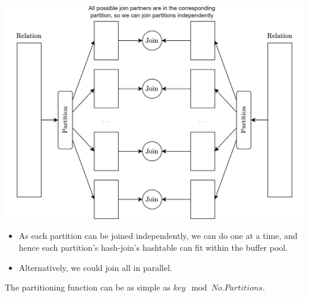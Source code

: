 \begin{center}
    \includegraphics[width=.9\textwidth]{algorithms_and_indices/images/partitioning.drawio.png}
\end{center}
\begin{itemize}
    \item As each partition can be joined independently, we can do one at a time, and hence each partition's hash-join's hashtable can fit within the buffer pool.
    \item Alternatively, we could join all in parallel.
\end{itemize}
The partitioning function can be as simple as $key \mod No. Partitions$.

